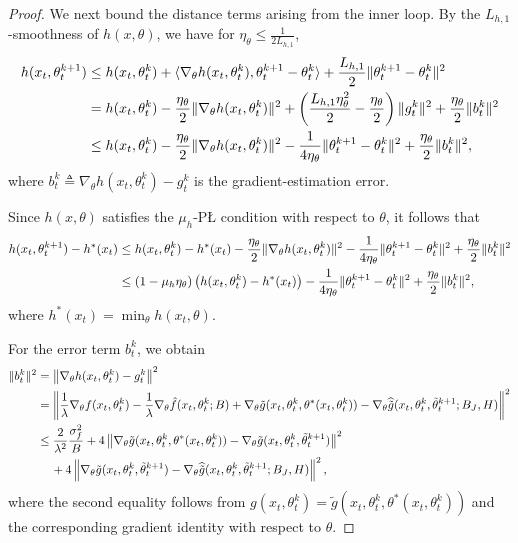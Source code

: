 \documentclass{article}
\theoremstyle{plain}
\theoremstyle{definition}
\theoremstyle{remark}
\def\bydef{\triangleq}
\begin{document}
\begin{proof}
We next bound the distance terms arising from the inner loop.     By the $L_{h,1}$-smoothness of $h(x,\theta)$, we have for $\eta_\theta \leq \frac{1}{2L_{h,1}}$,
    \begin{align}
        h(x_t,\theta_t^{k+1}) & \leq h(x_t,\theta_t^{k}) + \langle \nabla_\theta h(x_t,\theta_t^k), \theta_t^{k+1} - \theta_t^k  \rangle + \frac{L_{h,1}}{2} \| \theta_t^{k+1} - \theta_t^k \|^2 \notag \\
        & = h(x_t,\theta_t^k) - \frac{\eta_\theta}{2} \|  \nabla_\theta h(x_t,\theta_t^k)\|^2 + \left(\frac{L_{h,1}\eta_\theta^2 }{2} - \frac{\eta_\theta}{2}\right) \|g_t^k \|^2 + \frac{\eta_\theta}{2} \|b_t^k \|^2 \notag \\
        & \leq h(x_t,\theta_t^k) - \frac{\eta_\theta}{2} \|  \nabla_\theta h(x_t,\theta_t^k)\|^2 - \frac{1}{4\eta_\theta} \|\theta_t^{k+1} - \theta_t^k \|^2 + \frac{\eta_\theta}{2} \|b_t^k \|^2,
    \end{align}
    where $b_t^k \bydef \nabla_\theta h(x_t,\theta_t^k) - g_t^k$ is the gradient-estimation error.

    Since $h(x,\theta)$ satisfies the $\mu_h$-P{\L} condition with respect to
$\theta$, it follows that
    \begin{align}
        h(x_t,\theta_t^{k+1}) - h^*(x_t) & \leq h(x_t,\theta_t^{k}) - h^*(x_t) - \frac{\eta_\theta}{2} \| \nabla_\theta h(x_t,\theta_t^k)\|^2   - \frac{1}{4\eta_\theta} \|\theta_t^{k+1} - \theta_t^k \|^2 + \frac{\eta_\theta}{2} \|b_t^k \|^2  \notag\\
        & \leq \left(1 - \mu_h \eta_\theta \right) \left(h(x_t,\theta_t^{k}) - h^*(x_t)\right) - \frac{1}{4\eta_\theta} \|\theta_t^{k+1} - \theta_t^k \|^2 + \frac{\eta_\theta}{2} \| b_t^k\|^2, \label{eq: descent-lemma-of-h-inner-loop-large-batch}
    \end{align}
    where $h^*(x_t) = \min_{\theta} h(x_t,\theta)$.

For the error term $b_t^k$, we obtain
    \begin{align}
        \| b_t^k\|^2 & = \left\|\nabla_\theta h(x_t,\theta_t^k) - g_t^k \right\|^2 \notag\\
        & = \left\|\frac{1}{\lambda} \nabla_\theta f(x_t,\theta_t^k) - \frac{1}{\lambda} \nabla_\theta \hat{f}(x_t,\theta_t^k;B) + \nabla_\theta \tilde{g}(x_t,\theta_t^k,\theta^*(x_t,\theta_t^k)) - \nabla_\theta \widehat{\tilde{g}}(x_t,\theta_t^k, \tilde{\theta}_t^{k+1}; B_J, H)  \right\|^2 \notag\\
        & \leq \frac{2}{\lambda^2} \frac{\sigma_f^2}{B} + 4\left\| \nabla_\theta \tilde{g}(x_t,\theta_t^k,\theta^*(x_t,\theta_t^k)) - \nabla_\theta \tilde{g}(x_t,\theta_t^k, \tilde{\theta}_t^{k+1})  \right\|^2 \notag \\
        & \quad \, + 4 \left\|\nabla_\theta \tilde{g}(x_t,\theta_t^k, \tilde{\theta}_t^{k+1})  - \nabla_\theta \widehat{\tilde{g}}(x_t,\theta_t^k, \tilde{\theta}_t^{k+1};B_J,H)  \right\|^2,
    \end{align}
    where the second equality follows from $g(x_t,\theta_t^k)=\tilde g(x_t,\theta_t^k,\theta^*(x_t,\theta_t^k))$ and the corresponding gradient identity with respect to $\theta$.


\end{proof}
\end{document}
